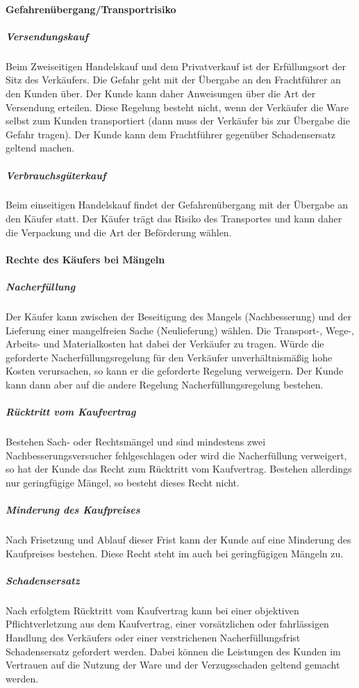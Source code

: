 \paragraph{Gefahrenübergang/Transportrisiko}

\subparagraph{Versendungskauf} Beim Zweiseitigen Handelskauf und dem Privatverkauf ist der Erfüllungsort der Sitz des Verkäufers. Die Gefahr geht mit der Übergabe an den Frachtführer an den Kunden über. Der Kunde kann daher Anweisungen über die Art der Versendung erteilen. Diese Regelung besteht nicht, wenn der Verkäufer die Ware selbst zum Kunden transportiert (dann muss der Verkäufer bis zur Übergabe die Gefahr tragen). Der Kunde kann dem Frachtführer gegenüber Schadensersatz geltend machen.

\subparagraph{Verbrauchsgüterkauf} Beim einseitigen Handelskauf findet der Gefahrenübergang mit der Übergabe an den Käufer statt. Der Käufer trägt das Risiko des Transportes und kann daher die Verpackung und die Art der Beförderung wählen.

\paragraph{Rechte des Käufers bei Mängeln}

\subparagraph{Nacherfüllung} Der Käufer kann zwischen der Beseitigung des Mangels (Nachbesserung) und der Lieferung einer mangelfreien Sache (Neulieferung) wählen. Die Transport-, Wege-, Arbeits- und Materialkosten hat dabei der Verkäufer zu tragen. Würde die geforderte Nacherfüllungsregelung für den Verkäufer unverhältnismäßig hohe Kosten verursachen, so kann er die geforderte Regelung verweigern. Der Kunde kann dann aber auf die andere Regelung Nacherfüllungsregelung bestehen.
	
\subparagraph{Rücktritt vom Kaufvertrag} Bestehen Sach- oder Rechtsmängel und sind mindestens zwei Nachbesserungsversucher fehlgeschlagen oder wird die Nacherfüllung verweigert, so hat der Kunde das Recht zum Rücktritt vom Kaufvertrag. Bestehen allerdings nur geringfügige Mängel, so besteht dieses Recht nicht.

\subparagraph{Minderung des Kaufpreises} Nach Frisetzung und Ablauf dieser Frist kann der Kunde auf eine Minderung des Kaufpreises bestehen. Diese Recht steht im auch bei geringfügigen Mängeln zu.

\subparagraph{Schadensersatz} Nach erfolgtem Rücktritt vom Kaufvertrag kann bei einer objektiven Pflichtverletzung aus dem Kaufvertrag, einer vorsätzlichen oder fahrlässigen Handlung des Verkäufers oder einer verstrichenen Nacherfüllungsfrist Schadensersatz gefordert werden. Dabei können die Leistungen des Kunden im Vertrauen auf die Nutzung der Ware und der Verzugsschaden geltend gemacht werden.

